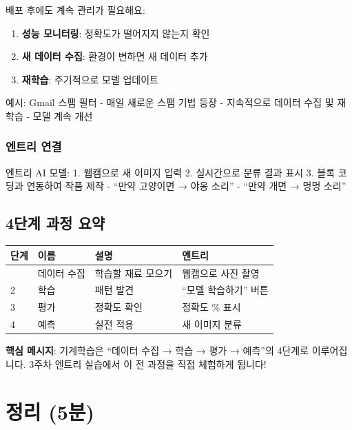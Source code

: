 \documentclass[a4paper, 11pt]{article}
\providecommand{\tightlist}{%
  \setlength{\itemsep}{0pt}\setlength{\parskip}{0pt}}
\renewenvironment{quote}
  {\begin{tcolorbox}[colback=lightblue!30, colframe=mainblue!50,
   left=8pt, right=8pt, top=4pt, bottom=4pt, breakable]}
  {\end{tcolorbox}}
\begin{document}
배포 후에도 계속 관리가 필요해요:

\begin{enumerate}
\def\labelenumi{\arabic{enumi}.}
\tightlist
\item
  \textbf{성능 모니터링}: 정확도가 떨어지지 않는지 확인
\item
  \textbf{새 데이터 수집}: 환경이 변하면 새 데이터 추가
\item
  \textbf{재학습}: 주기적으로 모델 업데이트
\end{enumerate}

예시: Gmail 스팸 필터 - 매일 새로운 스팸 기법 등장 - 지속적으로 데이터
수집 및 재학습 - 모델 계속 개선

\hypertarget{uxc5d4uxd2b8uxb9ac-uxc5f0uxacb0-3}{%
\subsubsection{엔트리 연결}\label{uxc5d4uxd2b8uxb9ac-uxc5f0uxacb0-3}}

엔트리 AI 모델: 1. 웹캠으로 새 이미지 입력 2. 실시간으로 분류 결과 표시
3. 블록 코딩과 연동하여 작품 제작 - ``만약 고양이면 → 야옹 소리'' -
``만약 개면 → 멍멍 소리''

\hypertarget{uxb2e8uxacc4-uxacfcuxc815-uxc694uxc57d}{%
\subsection{4단계 과정
요약}\label{uxb2e8uxacc4-uxacfcuxc815-uxc694uxc57d}}

\begin{longtable}{p{2.0cm}p{4.0cm}p{4.0cm}p{4.0cm}}
\toprule\noalign{}
단계 & 이름 & 설명 & 엔트리 \\
\midrule\noalign{}
\endhead
\bottomrule\noalign{}
\endlastfoot
1 & 데이터 수집 & 학습할 재료 모으기 & 웹캠으로 사진 촬영 \\
2 & 학습 & 패턴 발견 & ``모델 학습하기'' 버튼 \\
3 & 평가 & 정확도 확인 & 정확도 \% 표시 \\
4 & 예측 & 실전 적용 & 새 이미지 분류 \\
\end{longtable}

\begin{quote}
 \textbf{핵심 메시지}: 기계학습은 ``데이터 수집 → 학습 → 평가 →
예측''의 4단계로 이루어집니다. 3주차 엔트리 실습에서 이 전 과정을 직접
체험하게 됩니다!
\end{quote}

\hypertarget{uxc815uxb9ac-5uxbd84}{%
\section{ 정리 (5분)}\label{uxc815uxb9ac-5uxbd84}}
\end{document}
